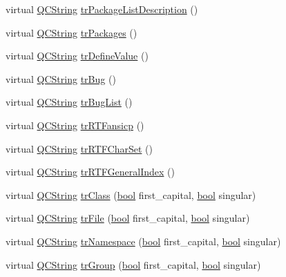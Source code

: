 \begin{DoxyCompactItemize}
\item 
virtual \hyperlink{class_q_c_string}{Q\+C\+String} \hyperlink{class_translator_czech_a7f9a5cb82348d25cc39c6bd6a27fa68b}{tr\+Package\+List\+Description} ()
\item 
virtual \hyperlink{class_q_c_string}{Q\+C\+String} \hyperlink{class_translator_czech_ac277d68bfff30f516e348d4cc6a7f86c}{tr\+Packages} ()
\item 
virtual \hyperlink{class_q_c_string}{Q\+C\+String} \hyperlink{class_translator_czech_a1167f69c1226e098756566531f178695}{tr\+Define\+Value} ()
\item 
virtual \hyperlink{class_q_c_string}{Q\+C\+String} \hyperlink{class_translator_czech_afee8af424e80ab3c46243633176afc54}{tr\+Bug} ()
\item 
virtual \hyperlink{class_q_c_string}{Q\+C\+String} \hyperlink{class_translator_czech_aaf47832229e4dc495eb861a32d13ca30}{tr\+Bug\+List} ()
\item 
virtual \hyperlink{class_q_c_string}{Q\+C\+String} \hyperlink{class_translator_czech_a8c606b50d1afc33b7a86c36292a7b54b}{tr\+R\+T\+Fansicp} ()
\item 
virtual \hyperlink{class_q_c_string}{Q\+C\+String} \hyperlink{class_translator_czech_a553efdc46375639c50cad98acf5203df}{tr\+R\+T\+F\+Char\+Set} ()
\item 
virtual \hyperlink{class_q_c_string}{Q\+C\+String} \hyperlink{class_translator_czech_ac2aa9f9d434a7f6eb4feb917d682730a}{tr\+R\+T\+F\+General\+Index} ()
\item 
virtual \hyperlink{class_q_c_string}{Q\+C\+String} \hyperlink{class_translator_czech_a989173fb73821cd05b9022d338528e6f}{tr\+Class} (\hyperlink{qglobal_8h_a1062901a7428fdd9c7f180f5e01ea056}{bool} first\+\_\+capital, \hyperlink{qglobal_8h_a1062901a7428fdd9c7f180f5e01ea056}{bool} singular)
\item 
virtual \hyperlink{class_q_c_string}{Q\+C\+String} \hyperlink{class_translator_czech_aff3e4fe98dc7e439cc8367c0ac1e1dca}{tr\+File} (\hyperlink{qglobal_8h_a1062901a7428fdd9c7f180f5e01ea056}{bool} first\+\_\+capital, \hyperlink{qglobal_8h_a1062901a7428fdd9c7f180f5e01ea056}{bool} singular)
\item 
virtual \hyperlink{class_q_c_string}{Q\+C\+String} \hyperlink{class_translator_czech_a578cf2ce23f8343b797eb6541b401d3f}{tr\+Namespace} (\hyperlink{qglobal_8h_a1062901a7428fdd9c7f180f5e01ea056}{bool} first\+\_\+capital, \hyperlink{qglobal_8h_a1062901a7428fdd9c7f180f5e01ea056}{bool} singular)
\item 
virtual \hyperlink{class_q_c_string}{Q\+C\+String} \hyperlink{class_translator_czech_a4784647c17cdbf33aed76bc01c500eb2}{tr\+Group} (\hyperlink{qglobal_8h_a1062901a7428fdd9c7f180f5e01ea056}{bool} first\+\_\+capital, \hyperlink{qglobal_8h_a1062901a7428fdd9c7f180f5e01ea056}{bool} singular)

\end{DoxyCompactItemize}
